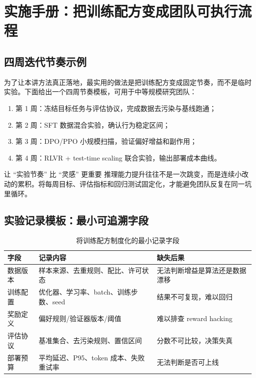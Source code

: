 \section{实施手册：把训练配方变成团队可执行流程}

\subsection{四周迭代节奏示例}
为了让本讲方法真正落地，最实用的做法是把训练配方变成固定节奏，而不是临时实验。下面给出一个四周节奏模板，可用于中等规模研究团队：
\begin{enumerate}
    \item 第 1 周：冻结目标任务与评估协议，完成数据去污染与基线跑通；
    \item 第 2 周：SFT 数据混合实验，确认行为稳定区间；
    \item 第 3 周：DPO/PPO 小规模扫描，验证偏好增益和副作用；
    \item 第 4 周：RLVR + test-time scaling 联合实验，输出部署成本曲线。
\end{enumerate}

\begin{importantbox}{让 ``实验节奏'' 比 ``灵感'' 更重要}
推理能力提升往往不是一次跳变，而是连续小改动的累积。将每周目标、评估指标和回归测试固定化，才能避免团队反复在同一坑里循环。
\end{importantbox}

\subsection{实验记录模板：最小可追溯字段}
\begin{table}[H]
\centering
\renewcommand{\arraystretch}{1.2}
\begin{tabular}{p{3.0cm}p{3.7cm}p{4.1cm}}
\toprule
\textbf{字段} & \textbf{记录内容} & \textbf{缺失后果} \\
\midrule
数据版本 & 样本来源、去重规则、配比、许可状态 & 无法判断增益是算法还是数据漂移 \\
训练配置 & 优化器、学习率、batch、训练步数、seed & 结果不可复现，难以回归 \\
奖励定义 & 偏好规则/验证器版本/阈值 & 难以排查 reward hacking \\
评估协议 & 基准集合、去污染规则、置信区间 & 分数不可比较，决策失真 \\
部署预算 & 平均延迟、P95、token 成本、失败重试率 & 无法判断是否可上线 \\
\bottomrule
\end{tabular}
\caption{将训练配方制度化的最小记录字段}
\end{table}

